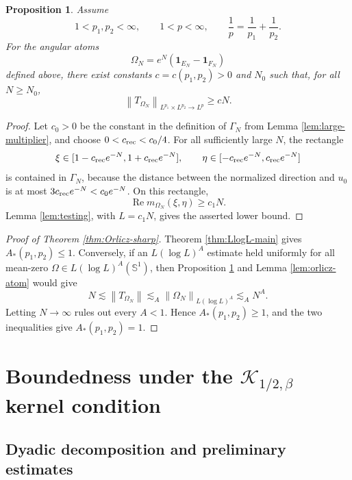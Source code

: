 \documentclass[11pt]{amsart}
\newtheorem{proposition}[definition]{Proposition}
\theoremstyle{remark}
\numberwithin{equation}{section}
\newcommand{\Sph}{\mathbb S^1}
\newcommand{\cK}{\mathcal K}
\newcommand{\norm}[1]{\left\lVert #1\right\rVert}
\newcommand{\one}{\mathbf 1}
\begin{document}
	\begin{proposition}\label{prop:operator-lower}
		Assume
		\[
		1<p_1,p_2<\infty,\qquad
		1<p<\infty,\qquad
		\frac1p=\frac1{p_1}+\frac1{p_2}.
		\]
		For the angular atoms
		\[
		\Omega_N=e^N(\one_{E_N}-\one_{F_N})
		\]
		defined above, there exist constants \(c=c(p_1,p_2)>0\) and \(N_0\) such
		that, for all \(N\ge N_0\),
		\[
		\norm{T_{\Omega_N}}_{L^{p_1}\times L^{p_2}\to L^p}
		\ge cN .
		\]
	\end{proposition}
	
	\begin{proof}
		Let \(c_0>0\) be the constant in the definition of \(\Gamma_N\) from Lemma
		\ref{lem:large-multiplier}, and choose \(0<c_{\rm rec}<c_0/4\).  For all
		sufficiently large \(N\), the rectangle
		\[
		\xi\in[1-c_{\rm rec}e^{-N},1+c_{\rm rec}e^{-N}],
		\qquad
		\eta\in[-c_{\rm rec}e^{-N},c_{\rm rec}e^{-N}]
		\]
		is contained in \(\Gamma_N\), because the distance between the normalized
		direction and \(u_0\) is at most \(3c_{\rm rec}e^{-N}<c_0e^{-N}\).  On this
		rectangle,
		\[
		\operatorname{Re}m_{\Omega_N}(\xi,\eta)\ge c_1N .
		\]
		Lemma \ref{lem:testing}, with \(L=c_1N\), gives the asserted lower bound.
	\end{proof}
	
	\begin{proof}[Proof of Theorem \ref{thm:Orlicz-sharp}]
		Theorem \ref{thm:LlogL-main} gives \(A_*(p_1,p_2)\le1\).  Conversely, if an
		\(L(\log L)^A\) estimate held uniformly for all mean-zero
		\(\Omega\in L(\log L)^A(\Sph)\), then Proposition
		\ref{prop:operator-lower} and Lemma \ref{lem:orlicz-atom} would give
		\[
		N
		\lesssim
		\norm{T_{\Omega_N}}
		\lesssim_A
		\norm{\Omega_N}_{L(\log L)^A}
		\lesssim_A N^A .
		\]
		Letting \(N\to\infty\) rules out every \(A<1\).  Hence
		\(A_*(p_1,p_2)\ge1\), and the two inequalities give
		\(A_*(p_1,p_2)=1\).
	\end{proof}
	
	\vspace{0.3cm}
	
	
\section{Boundedness under the \(\cK_{1/2,\beta}\) kernel condition}
	
	\subsection{Dyadic decomposition and preliminary estimates}
	
\end{document}
